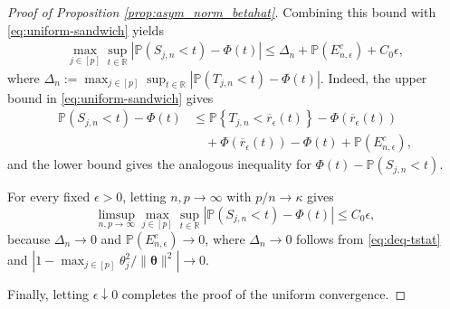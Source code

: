 \documentclass[12pt,reqno]{amsart}
\newcommand{\pr}{\mathbb{P}}
\def\btheta{\bm{\theta}}
\begin{document}
\begin{proof}[Proof of Proposition \ref{prop:asym_norm_betahat}]
{Combining this bound with \eqref{eq:uniform-sandwich} yields
\begin{align*}
\max_{j\in[p]}
\sup_{t\in\mathbb R}
\left|
\pr(S_{j,n}<t)-\Phi(t)
\right|
\le
\Delta_n
+
\pr(E_{n,\epsilon}^c)
+
C_0\epsilon,
\end{align*}
where $\Delta_n:=\max_{j\in[p]}
\sup_{t\in\mathbb R}
\left|\pr(T_{j,n}<t)-\Phi(t)
\right|.$
Indeed, the upper bound in \eqref{eq:uniform-sandwich} gives
\begin{align*}
\pr(S_{j,n}<t)-\Phi(t)
&\le
\pr\left\{
T_{j,n}<\overline r_\epsilon(t)
\right\}
-\Phi\left(\overline r_\epsilon(t)\right)\\
&\quad+
\Phi\left(\overline r_\epsilon(t)\right)-\Phi(t)
+
\pr(E_{n,\epsilon}^c),
\end{align*}
and the lower bound gives the analogous inequality for
$\Phi(t)-\pr(S_{j,n}<t)$.

For every fixed $\epsilon>0$, letting $n,p\to\infty$ with
$p/n\to\kappa$ gives
\[
\limsup_{n,p\to\infty}
\max_{j\in[p]}
\sup_{t\in\mathbb R}
\left|
\pr(S_{j,n}<t)-\Phi(t)
\right|
\le C_0\epsilon,
\]
because $\Delta_n\to0$ and
$\pr(E_{n,\epsilon}^c)\to0$, where 
$\Delta_n\to0$ follows from \eqref{eq:deq-tstat} and $|1-\max_{j\in[p]}\theta_j^2/\|\btheta\|^2|\to0$.

Finally, letting $\epsilon\downarrow0$ completes the proof of the uniform convergence.
}
\end{proof}
\end{document}
